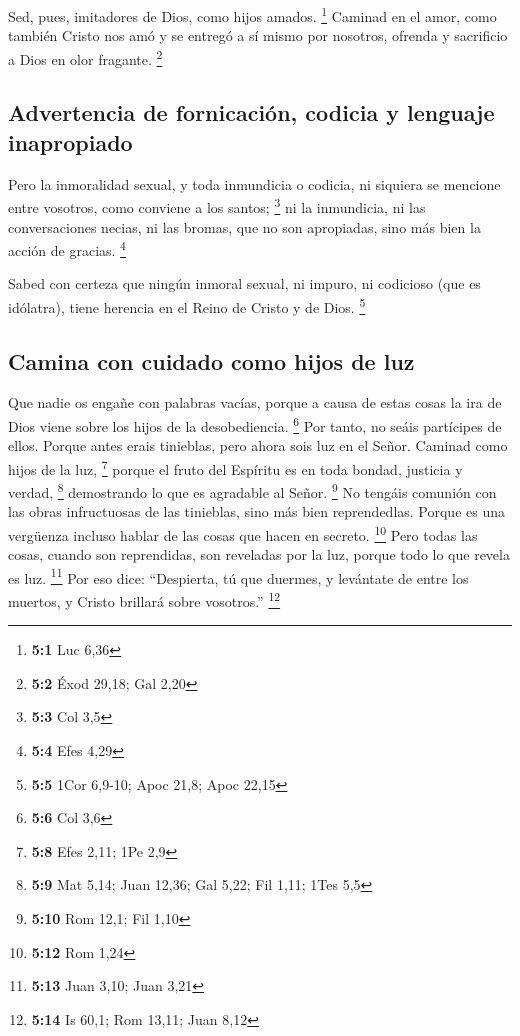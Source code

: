 \begin{paracol}{2}
 Sed, pues, imitadores de Dios, como hijos amados.
\footnote{\textbf{5:1} Luc 6,36}  Caminad en el amor, como
también Cristo nos amó y se entregó a sí mismo por nosotros, ofrenda y
sacrificio a Dios en olor fragante. \footnote{\textbf{5:2} Éxod 29,18;
  Gal 2,20}

\hypertarget{advertencia-de-fornicaciuxf3n-codicia-y-lenguaje-inapropiado}{%
\subsection{Advertencia de fornicación, codicia y lenguaje
inapropiado}\label{advertencia-de-fornicaciuxf3n-codicia-y-lenguaje-inapropiado}}

 Pero la inmoralidad sexual, y toda inmundicia o codicia,
ni siquiera se mencione entre vosotros, como conviene a los santos;
\footnote{\textbf{5:3} Col 3,5}  ni la inmundicia, ni las
conversaciones necias, ni las bromas, que no son apropiadas, sino más
bien la acción de gracias. \footnote{\textbf{5:4} Efes 4,29}

 Sabed con certeza que ningún inmoral sexual, ni impuro,
ni codicioso (que es idólatra), tiene herencia en el Reino de Cristo y
de Dios. \footnote{\textbf{5:5} 1Cor 6,9-10; Apoc 21,8; Apoc 22,15}

\hypertarget{camina-con-cuidado-como-hijos-de-luz}{%
\subsection{Camina con cuidado como hijos de
luz}\label{camina-con-cuidado-como-hijos-de-luz}}

 Que nadie os engañe con palabras vacías, porque a causa
de estas cosas la ira de Dios viene sobre los hijos de la desobediencia.
\footnote{\textbf{5:6} Col 3,6}  Por tanto, no seáis
partícipes de ellos.  Porque antes erais tinieblas, pero
ahora sois luz en el Señor. Caminad como hijos de la luz, \footnote{\textbf{5:8}
  Efes 2,11; 1Pe 2,9}  porque el fruto del Espíritu es en
toda bondad, justicia y verdad, \footnote{\textbf{5:9} Mat 5,14; Juan
  12,36; Gal 5,22; Fil 1,11; 1Tes 5,5}  demostrando lo
que es agradable al Señor. \footnote{\textbf{5:10} Rom 12,1; Fil 1,10}
 No tengáis comunión con las obras infructuosas de las
tinieblas, sino más bien reprendedlas.  Porque es una
vergüenza incluso hablar de las cosas que hacen en secreto. \footnote{\textbf{5:12}
  Rom 1,24}  Pero todas las cosas, cuando son
reprendidas, son reveladas por la luz, porque todo lo que revela es luz.
\footnote{\textbf{5:13} Juan 3,10; Juan 3,21}  Por eso
dice: ``Despierta, tú que duermes, y levántate de entre los muertos, y
Cristo brillará sobre vosotros.'' \footnote{\textbf{5:14} Is 60,1; Rom
  13,11; Juan 8,12}


\end{paracol}
